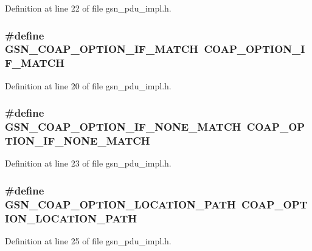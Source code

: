 Definition at line 22 of file gsn\_\-pdu\_\-impl.h.

\hypertarget{a00538_adf035ba37a37f2a207f53e88d7676b8b}{
\subsubsection[{GSN\_\-COAP\_\-OPTION\_\-IF\_\-MATCH}]{\setlength{\rightskip}{0pt plus 5cm}\#define GSN\_\-COAP\_\-OPTION\_\-IF\_\-MATCH~COAP\_\-OPTION\_\-IF\_\-MATCH}}
\label{a00538_adf035ba37a37f2a207f53e88d7676b8b}


Definition at line 20 of file gsn\_\-pdu\_\-impl.h.

\hypertarget{a00538_abf47e54e8c0f72612737e3d7813613bd}{
\subsubsection[{GSN\_\-COAP\_\-OPTION\_\-IF\_\-NONE\_\-MATCH}]{\setlength{\rightskip}{0pt plus 5cm}\#define GSN\_\-COAP\_\-OPTION\_\-IF\_\-NONE\_\-MATCH~COAP\_\-OPTION\_\-IF\_\-NONE\_\-MATCH}}
\label{a00538_abf47e54e8c0f72612737e3d7813613bd}


Definition at line 23 of file gsn\_\-pdu\_\-impl.h.

\hypertarget{a00538_a1a9d0eb2a0cd7f7e6c9af4439de1ba44}{
\subsubsection[{GSN\_\-COAP\_\-OPTION\_\-LOCATION\_\-PATH}]{\setlength{\rightskip}{0pt plus 5cm}\#define GSN\_\-COAP\_\-OPTION\_\-LOCATION\_\-PATH~COAP\_\-OPTION\_\-LOCATION\_\-PATH}}
\label{a00538_a1a9d0eb2a0cd7f7e6c9af4439de1ba44}


Definition at line 25 of file gsn\_\-pdu\_\-impl.h.

